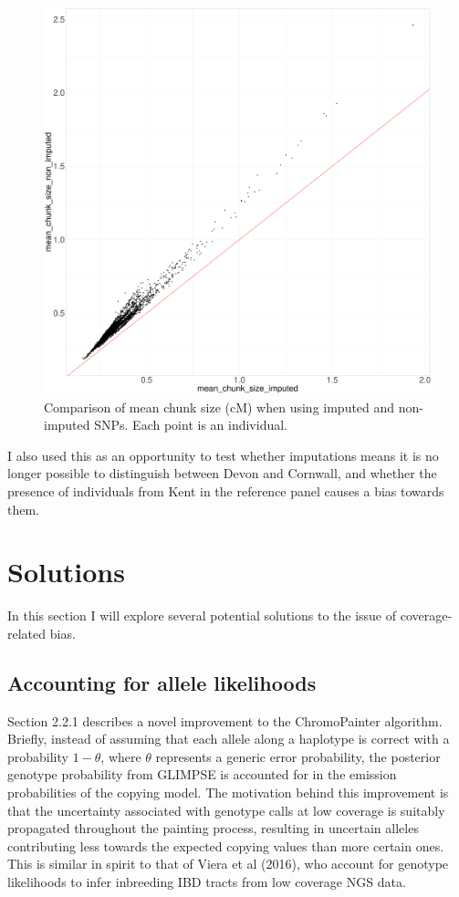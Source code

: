 \begin{figure}[htp]
    \centering
    \includegraphics[width=1.0\textwidth]{../images/chapter1/mean_chunk_size_comparison.pdf}
    \caption{Comparison of mean chunk size (cM) when using imputed and non-imputed SNPs. Each point is an individual.}
    \label{fig:mean_chunk_size_comparison}
\end{figure}


I also used this as an opportunity to test whether imputations means it is no longer possible to distinguish between Devon and Cornwall, and whether the presence of individuals from Kent in the reference panel causes a bias towards them. 


\section{Solutions}

In this section I will explore several potential solutions to the issue of coverage-related bias.

\subsection{Accounting for allele likelihoods}

Section 2.2.1 describes a novel improvement to the ChromoPainter algorithm. Briefly, instead of assuming that each allele along a haplotype is correct with a probability $1-\theta$, where $\theta$ represents a generic error probability, the posterior genotype probability from GLIMPSE is accounted for in the emission probabilities of the copying model. The motivation behind this improvement is that the uncertainty associated with genotype calls at low coverage is suitably propagated throughout the painting process, resulting in uncertain alleles contributing less towards the expected copying values than more certain ones. This is similar in spirit to that of Viera et al (2016), who account for genotype likelihoods to infer inbreeding IBD tracts from low coverage NGS data.

